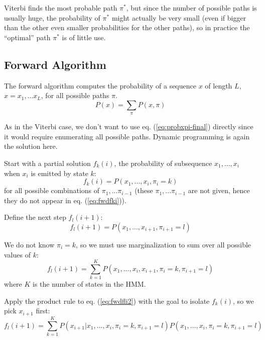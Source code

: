 Viterbi finds the most probable path $\pi^*$, but since the number of possible paths is usually huge, the probability of $\pi^*$ might actually be very small (even if bigger than the other even smaller probabilities for the other paths), so in practice the ``optimal'' path $\pi^*$ is of little use.



\subsection{Forward Algorithm}
\label{sec:fwdalg}

The forward algorithm computes the probability of a sequence $x$ of length $L$, $x = x_1, ... x_L$, for all possible paths $\pi$.
\begin{equation}
\boxed{P(x) = \sum_\pi P(x, \pi)}
\end{equation}

As in the Viterbi case, we don't want to use eq. (\ref{eq:probxpi-final}) directly since it would require enumerating all possible paths. Dynamic programming is again the solution here.

Start with a partial solution $f_k(i)$, the probability of subsequence $x_1,... , x_i$ when $x_i$ is emitted by state $k$:
\begin{equation}
f_k(i) = P(x_1,...,x_i, \pi_i = k)
\label{eq:fwdfki}
\end{equation}
for all possible combinations of $\pi_1,... \pi_{i-1}$ (these $\pi_1,... \pi_{i-1}$ are not given, hence they do not appear in eq. (\ref{eq:fwdfki})).

Define the next step $f_l(i+1)$:
\begin{equation}
f_l(i+1) = P(x_1,...,x_{i+1}, \pi_{i+1} = l)
\label{eq:fwdfli1}
\end{equation}

We do not know $\pi_i = k$, so we must use marginalization to sum over all possible values of $k$:
\begin{equation}
f_l(i+1) = \sum_{k=1}^K P(x_1,..., x_i, x_{i+1}, \pi_i=k, \pi_{i+1} = l)
\label{eq:fwdfli2}
\end{equation}
where $K$ is the number of states in the HMM.

Apply the product rule to eq. (\ref{eq:fwdfli2}) with the goal to isolate $f_k(i)$, so we pick $x_{i+1}$ first:
\begin{equation}
f_l(i+1) = \sum_{k=1}^K 
P(x_{i+1} | x_1,..., x_i,  \pi_i=k, \pi_{i+1} = l)
P(x_1,..., x_i,  \pi_i=k, \pi_{i+1} = l)
\label{eq:fwdfli3}
\end{equation}

